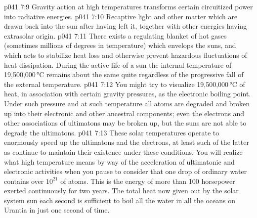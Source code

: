 \vs p041 7:9 \bibnobreakspace Gravity action at high temperatures transforms certain circuitized power into radiative energies.
\vs p041 7:10 \bibnobreakspace Recaptive light and other matter which are drawn back into the sun after having left it, together with other energies having extrasolar origin.
\vs p041 7:11 \pc There exists a regulating blanket of hot gases (sometimes millions of degrees in temperature) which envelops the suns, and which acts to stabilize heat loss and otherwise prevent hazardous fluctuations of heat dissipation. During the active life of a sun the internal temperature of 19,500,000\,°C remains about the same quite regardless of the progressive fall of the external temperature.
\vs p041 7:12 \pc You might try to visualize 19,500,000\,°C of heat, in association with certain gravity pressures, as the electronic boiling point. Under such pressure and at such temperature all atoms are degraded and broken up into their electronic and other ancestral components; even the electrons and other associations of ultimatons may be broken up, but the suns are not able to degrade the ultimatons.
\vs p041 7:13 These solar temperatures operate to enormously speed up the ultimatons and the electrons, at least such of the latter as continue to maintain their existence under these conditions. You will realize what high temperature means by way of the acceleration of ultimatonic and electronic activities when you pause to consider that one drop of ordinary water contains over $10^{21}$ of atoms. This is the energy of more than 100 horsepower exerted continuously for two years. The total heat now given out by the solar system sun each second is sufficient to boil all the water in all the oceans on Urantia in just one second of time.
